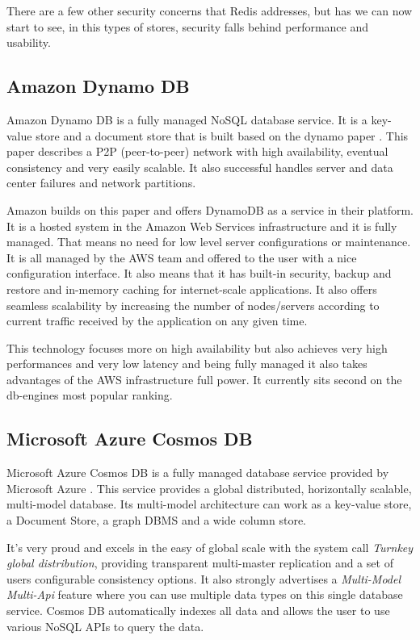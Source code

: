 There are a few other security concerns that Redis addresses, but has we can now start to see, in this types of stores, security falls behind performance and usability.

\subsection{Amazon Dynamo DB}
\label{ssec:amazon_dynamo_db}

Amazon Dynamo DB \cite{dynamo:1} is a fully managed NoSQL database service. It is a key-value store and a document store that is built based on the dynamo paper \cite{dynamo:2}. This paper describes a \gls{P2P} (peer-to-peer) network with high availability, eventual consistency and very easily scalable. It also successful handles server and data center failures and network partitions.

Amazon builds on this paper and offers DynamoDB as a service in their platform. It is a hosted system in the Amazon Web Services \cite{aws:1} infrastructure and it is fully managed. That means no need for low level server configurations or maintenance. It is all managed by the \gls{AWS} team and offered to the user with a nice configuration interface. It also means that it has built-in security, backup and restore and in-memory caching for internet-scale applications. It also offers seamless scalability by increasing the number of nodes/servers according to current traffic received by the application on any given time. 

This technology focuses more on high availability but also achieves very high performances and very low latency and being fully managed it also takes advantages of the \gls{AWS} infrastructure full power. It currently sits second on the db-engines \cite{db-engine:2} most popular ranking.

\subsection{Microsoft Azure Cosmos DB}
\label{ssec:microsoft_azure_cosmos_db}

Microsoft Azure Cosmos DB \cite{cosmos:1} is a fully managed database service provided by Microsoft Azure \cite{azure:1}. This service provides a global distributed, horizontally scalable, multi-model database. Its multi-model architecture can work as a key-value store, a Document Store, a graph \gls{DBMS} and a wide column store.

It's very proud and excels in the easy of global scale with the system call \textit{Turnkey global distribution}, providing transparent multi-master replication and a set of users configurable consistency options. It also strongly advertises a \textit{Multi-Model Multi-Api} feature where you can use multiple data types on this single database service. Cosmos DB automatically indexes all data and allows the user to use various NoSQL APIs to query the data.

